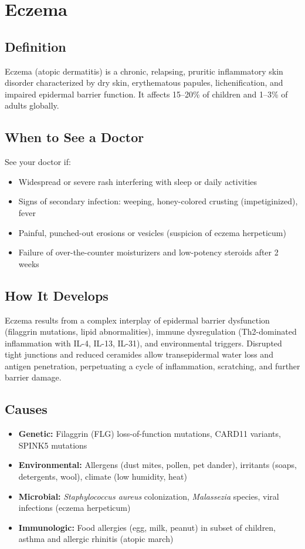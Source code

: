 \chapter{Eczema}

\section*{Definition}
Eczema (atopic dermatitis) is a chronic, relapsing, pruritic inflammatory skin disorder characterized by dry skin, erythematous papules, lichenification, and impaired epidermal barrier function. It affects 15--20\% of children and 1--3\% of adults globally.

\section*{When to See a Doctor}
See your doctor if:
\begin{itemize}
  \item Widespread or severe rash interfering with sleep or daily activities
  \item Signs of secondary infection: weeping, honey-colored crusting (impetiginized), fever
  \item Painful, punched-out erosions or vesicles (suspicion of eczema herpeticum)
  \item Failure of over-the-counter moisturizers and low-potency steroids after 2 weeks
\end{itemize}

\section*{How It Develops}
Eczema results from a complex interplay of epidermal barrier dysfunction (filaggrin mutations, lipid abnormalities), immune dysregulation (Th2-dominated inflammation with IL-4, IL-13, IL-31), and environmental triggers. Disrupted tight junctions and reduced ceramides allow transepidermal water loss and antigen penetration, perpetuating a cycle of inflammation, scratching, and further barrier damage.

\section*{Causes}
\begin{itemize}
  \item \textbf{Genetic:} Filaggrin (FLG) loss-of-function mutations, CARD11 variants, SPINK5 mutations
  \item \textbf{Environmental:} Allergens (dust mites, pollen, pet dander), irritants (soaps, detergents, wool), climate (low humidity, heat)
  \item \textbf{Microbial:} \textit{Staphylococcus aureus} colonization, \textit{Malassezia} species, viral infections (eczema herpeticum)
  \item \textbf{Immunologic:} Food allergies (egg, milk, peanut) in subset of children, asthma and allergic rhinitis (atopic march)
\end{itemize}

